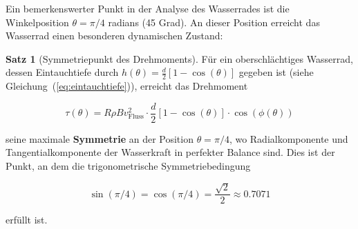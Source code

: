 \documentclass[a4paper,12pt]{article}
\theoremstyle{definition}
\newtheorem{satz}{Satz}
\begin{document}
Ein bemerkenswerter Punkt in der Analyse des Wasserrades ist die Winkelposition $\theta = \pi/4$ radians (45 Grad). An dieser Position erreicht das Wasserrad einen besonderen dynamischen Zustand:

\begin{satz}[Symmetriepunkt des Drehmoments]
  \label{satz:symmetriepunkt_pi4}
  Für ein oberschlächtiges Wasserrad, dessen Eintauchtiefe durch $h(\theta) = \frac{d}{2}[1 - \cos(\theta)]$ gegeben ist (siehe Gleichung~(\ref{eq:eintauchtiefe})), erreicht das Drehmoment
  
  \begin{equation}
    \tau(\theta) = R\rho B v_{\text{Fluss}}^2 \cdot \frac{d}{2}[1-\cos(\theta)] \cdot \cos(\phi(\theta))
  \end{equation}
  
  seine maximale \textbf{Symmetrie} an der Position $\theta = \pi/4$, wo Radialkomponente und Tangentialkomponente der Wasserkraft in perfekter Balance sind. Dies ist der Punkt, an dem die trigonometrische Symmetriebedingung
  
  \begin{equation}
    \sin(\pi/4) = \cos(\pi/4) = \frac{\sqrt{2}}{2} \approx 0.7071
  \end{equation}
  
  erfüllt ist.
\end{satz}
\end{document}
